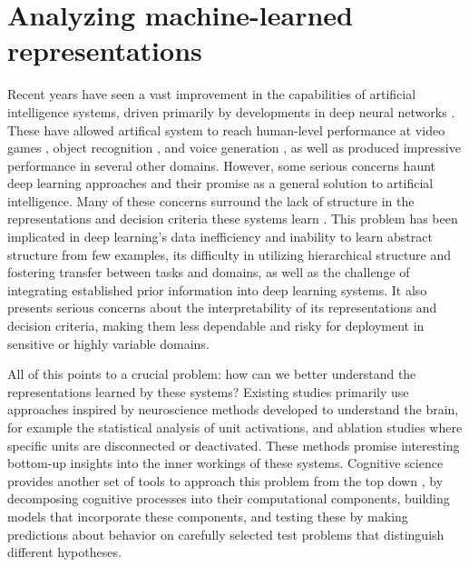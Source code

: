 \section{Analyzing machine-learned representations}

Recent years have seen a vast improvement in the capabilities of artificial intelligence systems, driven primarily by developments in deep neural networks \citep[see][for a review]{lecun2015deep}. These have allowed artifical system to reach human-level performance at video games \citep{mnih2015human}, object recognition \citep{russakovsky2015imagenet}, and voice generation \citep{oord2016wavenet}, as well as produced impressive performance in several other domains. However, some serious concerns haunt deep learning approaches and their promise as a general solution to artificial intelligence. Many of these concerns surround the lack of structure in the representations and decision criteria these systems learn \citep{marcus2018deep,lake18}. This problem has been implicated in deep learning's data inefficiency and inability to learn abstract structure from few examples, its difficulty in utilizing hierarchical structure and fostering transfer between tasks and domains, as well as the challenge of integrating established prior information into deep learning systems. It also presents serious concerns about the interpretability of its representations and decision criteria, making them less dependable and risky for deployment in sensitive or highly variable domains. 

All of this points to a crucial problem: how can we better understand the representations learned by these systems? Existing studies \citep[e.g.,][]{karpathy2015visualizing, li2015visualizing, yosinski2015understanding, zeiler2014visualizing} primarily use approaches inspired by neuroscience methods developed to understand the brain, for example the statistical analysis of unit activations, and ablation studies where specific units are disconnected or deactivated. These methods promise interesting bottom-up insights into the inner workings of these systems. Cognitive science provides another set of tools to approach this problem from the top down \citep{ritter17, kadar2017representation, mccoy2019right}, by decomposing cognitive processes into their computational components, building models that incorporate these components, and testing these by making predictions about behavior on carefully selected test problems that distinguish different hypotheses. 

